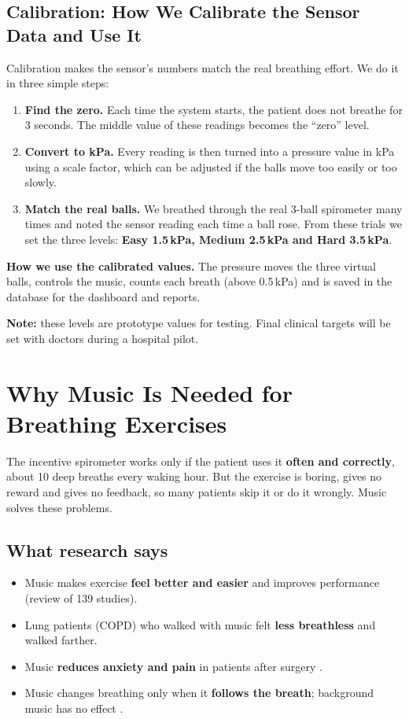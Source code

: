 \documentclass[12pt,a4paper]{article}
\begin{document}
\subsection{Calibration: How We Calibrate the Sensor Data and Use It}
\label{sec:calibration}

Calibration makes the sensor's numbers match the real breathing effort. We do it in three simple steps:

\begin{enumerate}[itemsep=4pt]
  \item \textbf{Find the zero.} Each time the system starts, the patient does not breathe for 3 seconds. The middle value of these readings becomes the ``zero'' level.
  \item \textbf{Convert to kPa.} Every reading is then turned into a pressure value in kPa using a scale factor, which can be adjusted if the balls move too easily or too slowly.
  \item \textbf{Match the real balls.} We breathed through the real 3-ball spirometer many times and noted the sensor reading each time a ball rose. From these trials we set the three levels: \textbf{Easy 1.5\,kPa, Medium 2.5\,kPa and Hard 3.5\,kPa}.
\end{enumerate}

\textbf{How we use the calibrated values.} The pressure moves the three virtual balls, controls the music, counts each breath (above 0.5\,kPa) and is saved in the database for the dashboard and reports.

\textbf{Note:} these levels are prototype values for testing. Final clinical targets will be set with doctors during a hospital pilot.

\section{Why Music Is Needed for Breathing Exercises}
\label{sec:whymusic}

The incentive spirometer works only if the patient uses it \textbf{often and correctly}, about 10 deep breaths every waking hour. But the exercise is boring, gives no reward and gives no feedback, so many patients skip it or do it wrongly. Music solves these problems.

\subsection{What research says}
\begin{itemize}
  \item Music makes exercise \textbf{feel better and easier} and improves performance (review of 139 studies).
  \item Lung patients (COPD) who walked with music felt \textbf{less breathless} and walked farther.
  \item Music \textbf{reduces anxiety and pain} in patients after surgery \cite{kuhlmann}.
  \item Music changes breathing only when it \textbf{follows the breath}; background music has no effect \cite{bhandari}.
\end{itemize}
\end{document}
